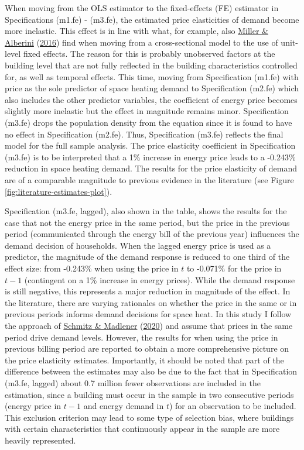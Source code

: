 \documentclass[12pt,twoside]{reedthesis}
\begin{document}
When moving from the OLS estimator to the fixed-effects (FE) estimator in Specifications (m1.fe) - (m3.fe), the estimated price elasticities of demand become more inelastic. This effect is in line with what, for example, also \protect\hyperlink{ref-miller_alberini16}{Miller \& Alberini} (\protect\hyperlink{ref-miller_alberini16}{2016}) find when moving from a cross-sectional model to the use of unit-level fixed effects. The reason for this is probably unobserved factors at the building level that are not fully reflected in the building characteristics controlled for, as well as temporal effects. This time, moving from Specification (m1.fe) with price as the sole predictor of space heating demand to Specification (m2.fe) which also includes the other predictor variables, the coefficient of energy price becomes slightly more inelastic but the effect in magnitude remains minor. Specification (m3.fe) drops the population density from the equation since it is found to have no effect in Specification (m2.fe). Thus, Specification (m3.fe) reflects the final model for the full sample analysis. The price elasticity coefficient in Specification (m3.fe) is to be interpreted that a 1\% increase in energy price leads to a -0.243\% reduction in space heating demand. The results for the price elasticity of demand are of a comparable magnitude to previous evidence in the literature (see Figure \ref{fig:literature-estimates-plot}).

Specification (m3.fe, lagged), also shown in the table, shows the results for the case that not the energy price in the same period, but the price in the previous period (communicated through the energy bill of the previous year) influences the demand decision of households. When the lagged energy price is used as a predictor, the magnitude of the demand response is reduced to one third of the effect size: from -0.243\% when using the price in \(t\) to -0.071\% for the price in \(t-1\) (contingent on a 1\% increase in energy prices). While the demand response is still negative, this represents a major reduction in magnitude of the effect. In the literature, there are varying rationales on whether the price in the same or in previous periods informs demand decisions for space heat. In this study I follow the approach of \protect\hyperlink{ref-schmitz_madlener20}{Schmitz \& Madlener} (\protect\hyperlink{ref-schmitz_madlener20}{2020}) and assume that prices in the same period drive demand levels. However, the results for when using the price in previous billing period are reported to obtain a more comprehensive picture on the price elasticity estimates. Importantly, it should be noted that part of the difference between the estimates may also be due to the fact that in Specification (m3.fe, lagged) about 0.7 million fewer observations are included in the estimation, since a building must occur in the sample in two consecutive periods (energy price in \(t-1\) and energy demand in \(t\)) for an observation to be included. This exclusion criterion may lead to some type of selection bias, where buildings with certain characteristics that continuously appear in the sample are more heavily represented.
\end{document}

